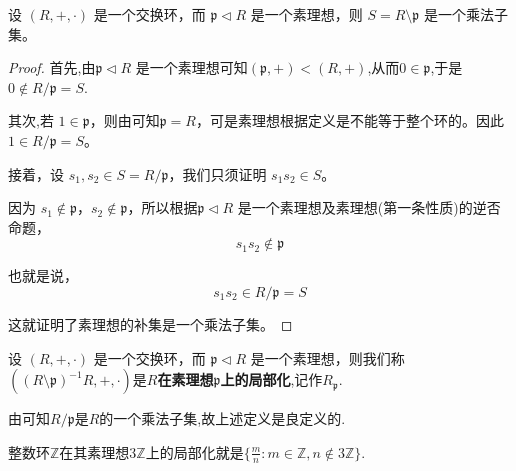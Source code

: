 \documentclass[../../main.tex]{subfiles}
\begin{document}
\begin{lemma}\label{lemma:交换环上的素理想的补集是乘法子集}
设 $(R, +, \cdot)$ 是一个交换环，而 $\mathfrak{p} \lhd  R$ 是一个素理想，则 $S = R \setminus \mathfrak{p}$ 是一个乘法子集。
\end{lemma}
\begin{proof}
首先,由$\mathfrak{p} \lhd  R$ 是一个素理想可知$(\mathfrak{p},+)<(R,+)$,从而$0\in \mathfrak{p}$,于是$0\notin R/\mathfrak{p}=S$.

其次,若 $1 \in \mathfrak{p}$，则由可知$\mathfrak{p} = R$，可是素理想根据定义是不能等于整个环的。因此 $1 \in R/\mathfrak{p}=S$。

接着，设 $s_1, s_2 \in S=R/\mathfrak{p}$，我们只须证明 $s_1s_2 \in S$。

因为 $s_1 \notin \mathfrak{p}$，$s_2 \notin \mathfrak{p}$，所以根据$\mathfrak{p} \lhd  R$ 是一个素理想及素理想(第一条性质)的逆否命题，
\[s_1s_2 \notin \mathfrak{p}\]

也就是说，
\[s_1s_2 \in R/\mathfrak{p}=S\]

这就证明了素理想的补集是一个乘法子集。
\end{proof}

\begin{definition}
设 $(R, +, \cdot)$ 是一个交换环，而 $\mathfrak{p} \lhd  R$ 是一个素理想，则我们称$((R\setminus \mathfrak{p})^{-1}R,+,\cdot)$是\textbf{$R$在素理想$\mathfrak{p}$上的局部化},记作$R_{\mathfrak{p}}.$
\end{definition}
\begin{remark}
由可知$R/\mathfrak{p}$是$R$的一个乘法子集,故上述定义是良定义的.
\end{remark}
\begin{note}
整数环$\mathbb{Z}$在其素理想$3\mathbb{Z}$上的局部化就是$\{\frac{m}{n}:m\in \mathbb{Z},n\notin 3\mathbb{Z}\}.$
\end{note}
\end{document}
